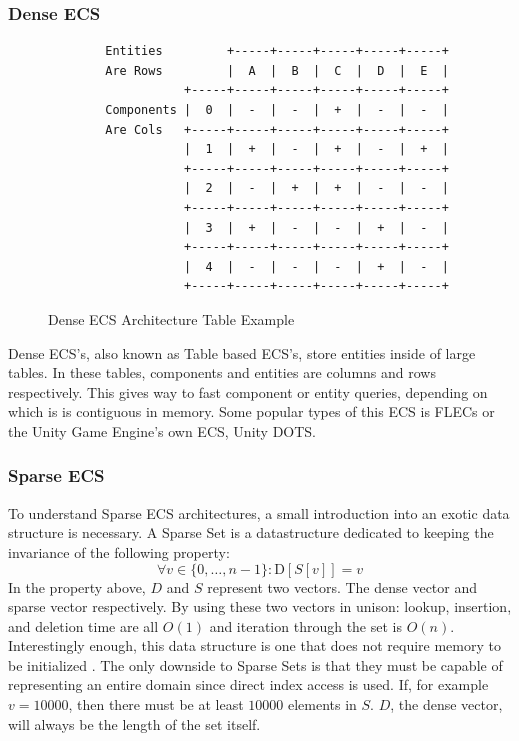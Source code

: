 \subsubsection{Dense ECS}
\begin{figure}[htbp]
    \centering
    \begin{verbatim}
        Entities         +-----+-----+-----+-----+-----+  
        Are Rows         |  A  |  B  |  C  |  D  |  E  |  
                   +-----+-----+-----+-----+-----+-----+  
        Components |  0  |  -  |  -  |  +  |  -  |  -  |  
        Are Cols   +-----+-----+-----+-----+-----+-----+  
                   |  1  |  +  |  -  |  +  |  -  |  +  |  
                   +-----+-----+-----+-----+-----+-----+  
                   |  2  |  -  |  +  |  +  |  -  |  -  |  
                   +-----+-----+-----+-----+-----+-----+  
                   |  3  |  +  |  -  |  -  |  +  |  -  |  
                   +-----+-----+-----+-----+-----+-----+  
                   |  4  |  -  |  -  |  -  |  +  |  -  |  
                   +-----+-----+-----+-----+-----+-----+                                 
    \end{verbatim}
    \caption{Dense ECS Architecture Table Example}
\end{figure}

Dense ECS's, also known as Table based ECS's, store entities inside of large tables. In these tables, components and entities are columns and rows respectively. This gives way to fast component or entity queries, depending on which is is contiguous in memory. Some popular types of this ECS is FLECs or the Unity Game Engine's own ECS, Unity DOTS. \cite{SanderMertensFAQ}

\subsubsection{Sparse ECS}
To understand Sparse ECS architectures, a small introduction into an exotic data structure is necessary. A Sparse Set is a datastructure dedicated to keeping the invariance of the following property:
\begin{equation*}
    \forall v \in \{0,\ldots, n-1\} : \text{D}[S[v]] = v
\end{equation*}
In the property above, $D$ and $S$ represent two vectors. The dense vector and sparse vector respectively. By using these two vectors in unison: lookup, insertion, and deletion time are all $O(1)$ and iteration through the set is $O(n)$. Interestingly enough, this data structure is one that does not require memory to be initialized \cite{sparse_profit}. The only downside to Sparse Sets is that they must be capable of representing an entire domain since direct index access is used. If, for example $v = 10000$, then there must be at least $10000$ elements in $S$. $D$, the dense vector, will always be the length of the set itself.

